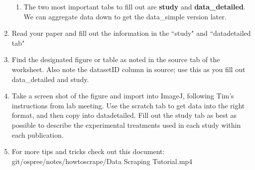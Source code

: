 \documentclass{article}\usepackage[]{graphicx}\usepackage[]{color}
\begin{document}
\begin{enumerate}
\begin{enumerate}
  \item The two most important tabs to fill out are \textbf{study} and \textbf{data\_detailed}. We can aggregate data down to get the data\_simple version later.
  \end{enumerate}
\item Read your paper and fill out the information in the ``study" and ``data\textunderscore detailed tab"
\item Find the designated figure or table as noted in the source tab of the worksheet. Also note the datasetID column in source; use this as you fill out data\_detailed and study.
\item Take a screen shot of the figure and import into ImageJ, following Tim's instructions from lab meeting. Use the scratch tab to get data into the right format, and then copy into data\textunderscore detailed. Fill out the study tab as best as possible to describe the experimental treatments used in each study within each publication.
\item For more tips and tricks check out this document: git/ospree/notes/howtoscrape/Data Scraping Tutorial.mp4
\end{enumerate}
\end{document}
